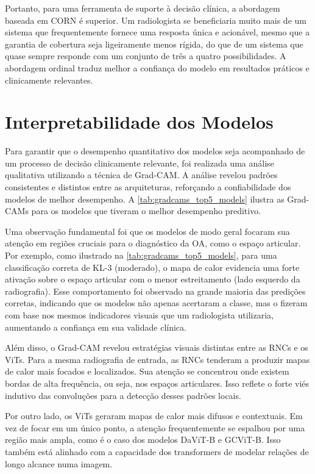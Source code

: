 Portanto, para uma ferramenta de suporte à decisão clínica, a abordagem baseada em CORN é superior. Um radiologista se beneficiaria muito mais de um sistema que frequentemente fornece uma resposta única e acionável, mesmo que a garantia de cobertura seja ligeiramente menos rígida, do que de um sistema que quase sempre responde com um conjunto de três a quatro possibilidades. A abordagem ordinal traduz melhor a confiança do modelo em resultados práticos e clinicamente relevantes.

\section{Interpretabilidade dos Modelos}

Para garantir que o desempenho quantitativo dos modelos seja acompanhado de um processo de decisão clinicamente relevante, foi realizada uma análise qualitativa utilizando a técnica de Grad-CAM. A análise revelou padrões consistentes e distintos entre as arquiteturas, reforçando a confiabilidade dos modelos de melhor desempenho. A \ref{tab:gradcams_top5_models} ilustra as Grad-CAMs para os modelos que tiveram o melhor desempenho preditivo.

Uma observação fundamental foi que os modelos de modo geral focaram sua atenção em regiões cruciais para o diagnóstico da OA, como o espaço articular. Por exemplo, como ilustrado na \autoref{tab:gradcams_top5_models}, para uma classificação correta de KL-3 (moderado), o mapa de calor evidencia uma forte ativação sobre o espaço articular com o menor estreitamento (lado esquerdo da radiografia). Esse comportamento foi observado na grande maioria das predições corretas, indicando que os modelos não apenas acertaram a classe, mas o fizeram com base nos mesmos indicadores visuais que um radiologista utilizaria, aumentando a confiança em sua validade clínica.

Além disso, o Grad-CAM revelou estratégias visuais distintas entre as RNCs e os ViTs. Para a mesma radiografia de entrada, as RNCs tenderam a produzir mapas de calor mais focados e localizados. Sua atenção se concentrou onde existem bordas de alta frequência, ou seja, nos espaços articulares. Isso reflete o forte viés indutivo das convoluções para a detecção desses padrões locais.

Por outro lado, os ViTs geraram mapas de calor mais difusos e contextuais. Em vez de focar em um único ponto, a atenção frequentemente se espalhou por uma região mais ampla, como é o caso dos modelos DaViT-B e GCViT-B. Isso também está alinhado com a capacidade dos transformers de modelar relações de longo alcance numa imagem.

